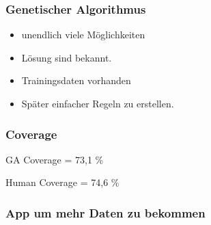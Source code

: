\begin{frame}
    \frametitle{Genetischer Algorithmus}
    \begin{itemize}
      \item unendlich viele Möglichkeiten
      \item Lösung sind bekannt.
      \item Trainingsdaten vorhanden
      \item Später einfacher Regeln zu erstellen.
    \end{itemize}
\end{frame}

\begin{frame}
  \frametitle{Coverage}
  \begin{center}
  \huge{GA Coverage = 73,1 \%}
  \end{center}
  \begin{center}
  \huge{Human Coverage = 74,6 \%}
  \end{center}
\end{frame}


\begin{frame}
    \frametitle{App um mehr Daten zu bekommen}
\end{frame}
